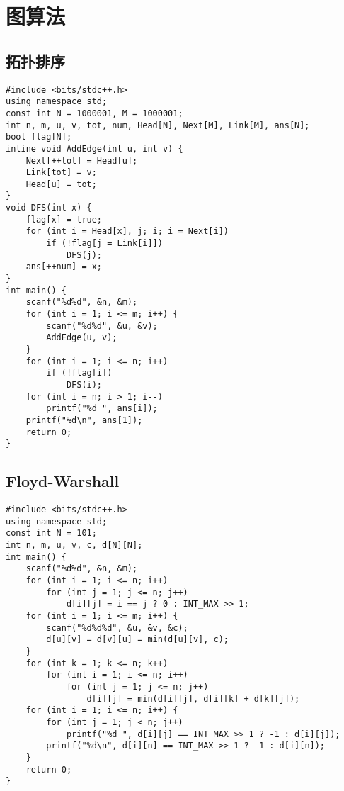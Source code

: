 \documentclass[a4paper]{article}
\begin{document}
\section{图算法}
\subsection{拓扑排序}
\begin{lstlisting}
#include <bits/stdc++.h>
using namespace std;
const int N = 1000001, M = 1000001;
int n, m, u, v, tot, num, Head[N], Next[M], Link[M], ans[N];
bool flag[N];
inline void AddEdge(int u, int v) {
    Next[++tot] = Head[u];
    Link[tot] = v;
    Head[u] = tot;
}
void DFS(int x) {
    flag[x] = true;
    for (int i = Head[x], j; i; i = Next[i])
        if (!flag[j = Link[i]])
            DFS(j);
    ans[++num] = x;
}
int main() {
    scanf("%d%d", &n, &m);
    for (int i = 1; i <= m; i++) {
        scanf("%d%d", &u, &v);
        AddEdge(u, v);
    }
    for (int i = 1; i <= n; i++)
        if (!flag[i])
            DFS(i);
    for (int i = n; i > 1; i--)
        printf("%d ", ans[i]);
    printf("%d\n", ans[1]);
    return 0;
}
\end{lstlisting}
\subsection{Floyd-Warshall}
\begin{lstlisting}
#include <bits/stdc++.h>
using namespace std;
const int N = 101;
int n, m, u, v, c, d[N][N];
int main() {
    scanf("%d%d", &n, &m);
    for (int i = 1; i <= n; i++)
        for (int j = 1; j <= n; j++)
            d[i][j] = i == j ? 0 : INT_MAX >> 1;
    for (int i = 1; i <= m; i++) {
        scanf("%d%d%d", &u, &v, &c);
        d[u][v] = d[v][u] = min(d[u][v], c);
    }
    for (int k = 1; k <= n; k++)
        for (int i = 1; i <= n; i++)
            for (int j = 1; j <= n; j++)
                d[i][j] = min(d[i][j], d[i][k] + d[k][j]);
    for (int i = 1; i <= n; i++) {
        for (int j = 1; j < n; j++)
            printf("%d ", d[i][j] == INT_MAX >> 1 ? -1 : d[i][j]);
        printf("%d\n", d[i][n] == INT_MAX >> 1 ? -1 : d[i][n]);
    }
    return 0;
}
\end{lstlisting}
\end{document}
